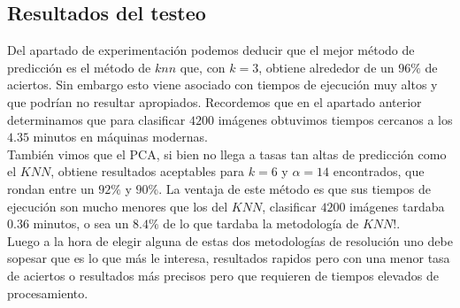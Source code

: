 \subsection{Resultados del testeo}
Del apartado de experimentación podemos deducir que el mejor método de predicción es el método de $knn$ que, con $k=3$, obtiene alrededor de un $96 \%$ de aciertos. Sin embargo esto viene asociado con tiempos de ejecución muy altos y que podrían no resultar apropiados. Recordemos que en el apartado anterior determinamos que para clasificar $4200$ imágenes obtuvimos tiempos cercanos a los $4.35$ minutos en máquinas modernas.
\\
También vimos que el PCA, si bien no llega a tasas tan altas de predicción como el $KNN$, obtiene resultados aceptables para $k = 6$ y $\alpha = 14$ encontrados, que rondan entre un $92 \%$ y $90 \%$. La ventaja de este método es que sus tiempos de ejecución son mucho menores que los del $KNN$, clasificar $4200$ imágenes tardaba $0.36$ minutos, o sea un $8.4 \%$ de lo que tardaba la metodología de $KNN$!. 
\\
Luego a la hora de elegir alguna de estas dos metodologías de resolución uno debe sopesar que es lo que más le interesa, resultados rapidos pero con una menor tasa de aciertos o resultados más precisos pero que requieren de tiempos elevados de procesamiento.
